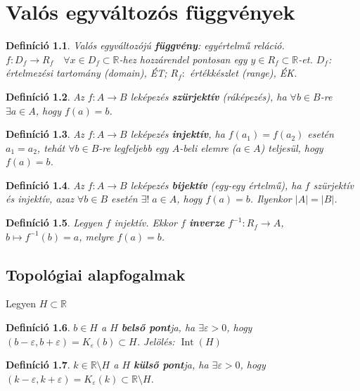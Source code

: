 \documentclass[a4paper,12pt,twoside]{book}
\DeclareMathOperator{\Int}{Int}
\newtheorem{defi}{Definíció}[chapter]
\theoremstyle{break}
\theoremstyle{plain}
\begin{document}
\chapter{Valós egyváltozós függvények}

\begin{defi}
 Valós egyváltozójú \textbf{függvény}: egyértelmű reláció. $f: D_f \to R_f \quad \forall x\in D_f\subset \mathbb{R}$-hez hozzárendel pontosan egy $y\in R_f\subset\mathbb{R}$-et. $D_f$: értelmezési tartomány (domain), ÉT; $R_f:$ értékkészlet (range), ÉK.
\end{defi}

\begin{defi}
 Az $f: A\to B$ leképezés \textbf{szürjektív} (ráképezés), ha $\forall b\in B$-re $\exists a\in A$, hogy $f(a)=b$.
\end{defi}

\begin{defi}
 Az $f: A\to B$ leképezés \textbf{injektív}, ha $f(a_1) = f(a_2)$ esetén $a_1=a_2$, tehát $\forall b\in B$-re legfeljebb egy $A$-beli elemre ($a\in A$) teljesül, hogy $f(a)=b$.
\end{defi}

\begin{defi}
 Az $f: A\to B$ leképezés \textbf{bijektív} (egy-egy értelmű), ha $f$ szürjektív és injektív, azaz $\forall b\in B$ esetén $\exists!\; a\in A$, hogy $f(a)=b$. Ilyenkor $|A|=|B|$.
\end{defi}

\begin{defi}
 Legyen $f$ injektív. Ekkor $f$ \textbf{inverze} $f^{-1}: R_f \to A$, $b\mapsto f^{-1}(b) = a$, melyre $f(a)=b$.
\end{defi}

\section{Topológiai alapfogalmak}

Legyen $H\subset \mathbb{R}$
\begin{defi}
 $b\in H$ a $H$ \textbf{belső pont}ja, ha $\exists \varepsilon >0$, hogy $(b-\varepsilon,b+\varepsilon)=K_{\varepsilon}(b) \subset H$. Jelölés: $\Int(H)$
\end{defi}
\begin{defi}
 $k\in \mathbb{R}\setminus H$ a $H$ \textbf{külső pont}ja, ha $\exists \varepsilon >0$, hogy $(k-\varepsilon,k+\varepsilon)=K_{\varepsilon}(k) \subset \mathbb{R}\setminus H$.
\end{defi}
\end{document}
